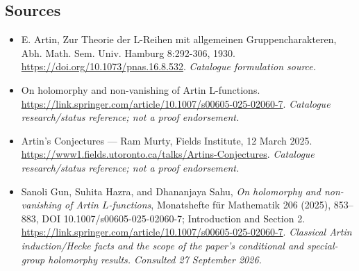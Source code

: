 \documentclass[11pt,a4paper]{article}
\numberwithin{equation}{section}
\begin{document}
\subsection{Sources}
\begin{itemize}\raggedright
\item[\textnormal{[S1]}]\hypertarget{source:66:1}{} E. Artin, Zur Theorie der L-Reihen mit allgemeinen Gruppencharakteren, Abh. Math. Sem. Univ. Hamburg 8:292-306, 1930.
\url{https://doi.org/10.1073/pnas.16.8.532}.
{\small\textit{Catalogue formulation source.}}
\item[\textnormal{[S2]}]\hypertarget{source:66:2}{} On holomorphy and non-vanishing of Artin L-functions.
\url{https://link.springer.com/article/10.1007/s00605-025-02060-7}.
{\small\textit{Catalogue research/status reference; not a proof endorsement.}}
\item[\textnormal{[S3]}]\hypertarget{source:66:3}{} Artin's Conjectures — Ram Murty, Fields Institute, 12 March 2025.
\url{https://www1.fields.utoronto.ca/talks/Artins-Conjectures}.
{\small\textit{Catalogue research/status reference; not a proof endorsement.}}

\item[\textnormal{[E1]}]\hypertarget{extra:66:1}{} Sanoli Gun, Suhita Hazra, and Dhananjaya Sahu, \emph{On holomorphy and non-vanishing of Artin $L$-functions}, Monatshefte für Mathematik 206 (2025), 853--883, DOI 10.1007/s00605-025-02060-7; Introduction and Section 2.
\url{https://link.springer.com/article/10.1007/s00605-025-02060-7}.
{\small\textit{Classical Artin induction/Hecke facts and the scope of the paper's conditional and special-group holomorphy results. Consulted 27 September 2026.}}
\end{itemize}
\end{document}
